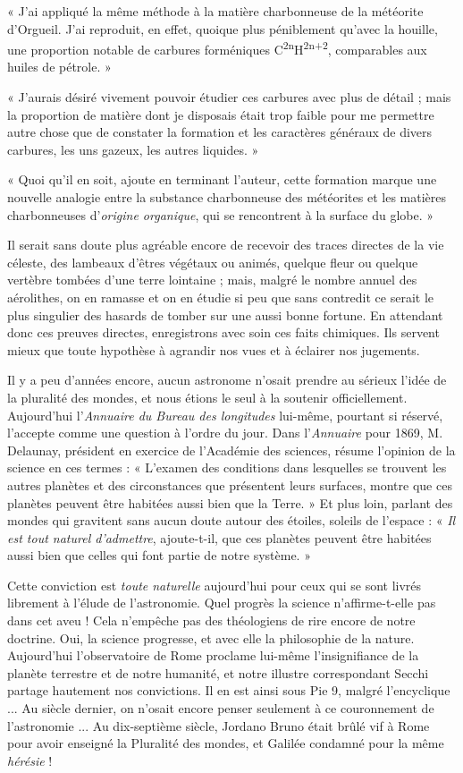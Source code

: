 \documentclass[a4paper, 11pt, oneside, landscape]{article}
\begin{document}
« J'ai appliqué la même méthode à la matière charbonneuse de la météorite d'Orgueil. J'ai reproduit, en effet, quoique plus péniblement qu'avec la houille, une proportion notable de carbures forméniques C\textsuperscript{2n}H\textsuperscript{2n+2}, comparables aux huiles de pétrole. »

« J'aurais désiré vivement pouvoir étudier ces carbures avec plus de détail ; mais la proportion de matière dont je disposais était trop faible pour me permettre autre chose que de constater la formation et les caractères généraux de divers carbures, les uns gazeux, les autres liquides. »

« Quoi qu'il en soit, ajoute en terminant l'auteur, cette formation marque une nouvelle analogie entre la substance charbonneuse des météorites et les matières charbonneuses d'\emph{origine organique}, qui se rencontrent à la surface du globe. »

Il serait sans doute plus agréable encore de recevoir des traces directes de la vie céleste, des lambeaux d'êtres végétaux ou animés, quelque fleur ou quelque vertèbre tombées d'une terre lointaine ; mais, malgré le nombre annuel des aérolithes, on en ramasse et on en étudie si peu que sans contredit ce serait le plus singulier des hasards de tomber sur une aussi bonne fortune. En attendant donc ces preuves directes, enregistrons avec soin ces faits chimiques. Ils servent mieux que toute hypothèse à agrandir nos vues et à éclairer nos jugements.

Il y a peu d'années encore, aucun astronome n'osait prendre au sérieux l'idée de la pluralité des mondes, et nous étions le seul à la soutenir officiellement. Aujourd'hui l'\emph{Annuaire du Bureau des longitudes} lui-même, pourtant si réservé, l'accepte comme une question à l'ordre du jour. Dans l'\emph{Annuaire} pour 1869, M. Delaunay, président en exercice de l'Académie des sciences, résume l'opinion de la science en ces termes : « L'examen des conditions dans lesquelles se trouvent les autres planètes et des circonstances que présentent leurs surfaces, montre que ces planètes peuvent être habitées aussi bien que la Terre. » Et plus loin, parlant des mondes qui gravitent sans aucun doute autour des étoiles, soleils de l'espace : « \emph{Il est tout naturel d'admettre}, ajoute-t-il, que ces planètes peuvent être habitées aussi bien que celles qui font partie de notre système. »

Cette conviction est \emph{toute naturelle} aujourd'hui pour ceux qui se sont livrés librement à l'élude de l'astronomie. Quel progrès la science n'affirme-t-elle pas dans cet aveu ! Cela n'empêche pas des théologiens de rire encore de notre doctrine. Oui, la science progresse, et avec elle la philosophie de la nature. Aujourd'hui l'observatoire de Rome proclame lui-même l'insignifiance de la planète terrestre et de notre humanité, et notre illustre correspondant Secchi partage hautement nos convictions. Il en est ainsi sous Pie 9, malgré l'encyclique ... Au siècle dernier, on n'osait encore penser seulement à ce couronnement de l'astronomie ... Au dix-septième siècle, Jordano Bruno était brûlé vif à Rome pour avoir enseigné la Pluralité des mondes, et Galilée condamné pour la même \emph{hérésie} !
\clearpage
\end{document}
